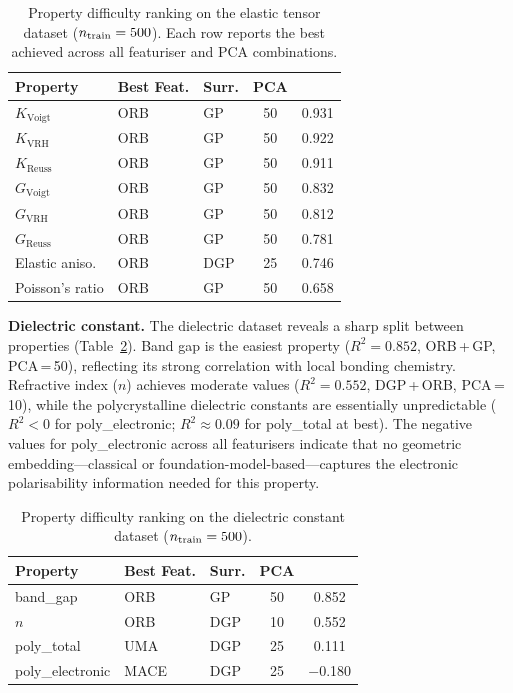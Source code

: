 \begin{table}[H]
    \centering
    \caption{Property difficulty ranking on the elastic tensor dataset ($n_{\text{train}} = 500$). Each row reports the best \Rtwo{} achieved across all featuriser and PCA combinations.}
    \label{tab:property_difficulty_elastic}
    \small
    \begin{tabular}{@{}lllcc@{}}
        \toprule
        \textbf{Property} & \textbf{Best Feat.} & \textbf{Surr.} & \textbf{PCA} & \textbf{\Rtwo{}} \\
        \midrule
        $K_{\text{Voigt}}$   & ORB & GP  & 50 & 0.931 \\
        $K_{\text{VRH}}$     & ORB & GP  & 50 & 0.922 \\
        $K_{\text{Reuss}}$   & ORB & GP  & 50 & 0.911 \\
        $G_{\text{Voigt}}$   & ORB & GP  & 50 & 0.832 \\
        $G_{\text{VRH}}$     & ORB & GP  & 50 & 0.812 \\
        $G_{\text{Reuss}}$   & ORB & GP  & 50 & 0.781 \\
        Elastic aniso.       & ORB & DGP & 25 & 0.746 \\
        Poisson's ratio      & ORB & GP  & 50 & 0.658 \\
        \bottomrule
    \end{tabular}
\end{table}

\textbf{Dielectric constant.}
The dielectric dataset reveals a sharp split between properties (Table~\ref{tab:property_difficulty_dielectric}).
Band gap is the easiest property ($R^2 = 0.852$, ORB\,+\,GP, PCA\,=\,50), reflecting its strong correlation with local bonding chemistry.
Refractive index ($n$) achieves moderate \Rtwo{} values ($R^2 = 0.552$, DGP\,+\,ORB, PCA\,=\,10), while the polycrystalline dielectric constants are essentially unpredictable ($R^2 < 0$ for poly\_electronic; $R^2 \approx 0.09$ for poly\_total at best).
The negative \Rtwo{} values for poly\_electronic across all featurisers indicate that no geometric embedding---classical or foundation-model-based---captures the electronic polarisability information needed for this property.

\begin{table}[H]
    \centering
    \caption{Property difficulty ranking on the dielectric constant dataset ($n_{\text{train}} = 500$).}
    \label{tab:property_difficulty_dielectric}
    \small
    \begin{tabular}{@{}lllcc@{}}
        \toprule
        \textbf{Property} & \textbf{Best Feat.} & \textbf{Surr.} & \textbf{PCA} & \textbf{\Rtwo{}} \\
        \midrule
        band\_gap        & ORB  & GP   & 50 & 0.852 \\
        $n$              & ORB  & DGP  & 10 & 0.552 \\
        poly\_total      & UMA  & DGP  & 25 & 0.111 \\
        poly\_electronic & MACE & DGP  & 25 & $-$0.180 \\
        \bottomrule
    \end{tabular}
\end{table}

